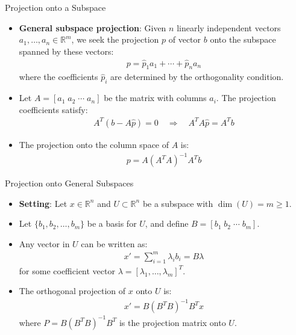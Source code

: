 \begin{frame}{Projection onto a Subspace}
    \begin{itemize}
        \item \textbf{General subspace projection}: Given $n$ linearly independent vectors $a_1, \ldots, a_n \in \mathbb{R}^m$, we seek the projection $p$ of vector $b$ onto the subspace spanned by these vectors:
        \begin{align}
            p = \hat{p}_1a_1 + \cdots + \hat{p}_na_n \label{proj1}
        \end{align}
        where the coefficients $\hat{p}_i$ are determined by the orthogonality condition.
        \item Let $A = [a_1 \; a_2 \; \cdots \; a_n]$ be the matrix with columns $a_i$. The projection coefficients satisfy:
        \begin{align}
            A^T(b-A\hat{p}) = 0 \quad \Rightarrow \quad A^TA\hat{p} = A^Tb
        \end{align}
        \item The projection onto the column space of $A$ is:
        \begin{align}
            p = A(A^TA)^{-1}A^Tb
        \end{align}
    \end{itemize}
\end{frame}

\begin{frame}{Projection onto General Subspaces}
    \begin{itemize}
        \item \textbf{Setting}: Let $x \in \mathbb{R}^n$ and $U \subset \mathbb{R}^n$ be a subspace with $\dim(U) = m \geq 1$.
        \item Let $\{b_1, b_2, \ldots, b_m\}$ be a basis for $U$, and define $B = [b_1 \; b_2 \; \cdots \; b_m]$.
        \item Any vector in $U$ can be written as:
        \begin{align*}
            x' = \sum_{i=1}^{m} \lambda_i b_i = B\lambda
        \end{align*}
        for some coefficient vector $\lambda = [\lambda_1, \ldots, \lambda_m]^T$.
    \end{itemize}
\end{frame}

\begin{frame}
    \begin{itemize}
        \item The orthogonal projection of $x$ onto $U$ is:
        \begin{align}
            x' = B(B^TB)^{-1}B^Tx
        \end{align}
        where $P = B(B^TB)^{-1}B^T$ is the projection matrix onto $U$.
    \end{itemize}
\end{frame}


